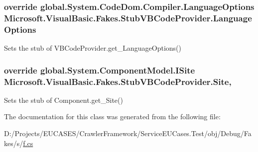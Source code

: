 \hypertarget{class_microsoft_1_1_visual_basic_1_1_fakes_1_1_stub_v_b_code_provider_ae7d748db0ca25f0105266509a590fe8c}{
\subsubsection[{Language\-Options}]{\setlength{\rightskip}{0pt plus 5cm}override global.\-System.\-Code\-Dom.\-Compiler.\-Language\-Options Microsoft.\-Visual\-Basic.\-Fakes.\-Stub\-V\-B\-Code\-Provider.\-Language\-Options\hspace{0.3cm}{\ttfamily [get]}}}\label{class_microsoft_1_1_visual_basic_1_1_fakes_1_1_stub_v_b_code_provider_ae7d748db0ca25f0105266509a590fe8c}


Sets the stub of V\-B\-Code\-Provider.\-get\-\_\-\-Language\-Options()

\hypertarget{class_microsoft_1_1_visual_basic_1_1_fakes_1_1_stub_v_b_code_provider_a75e5c8469c906665058f0ffc4a241e16}{
\subsubsection[{Site}]{\setlength{\rightskip}{0pt plus 5cm}override global.\-System.\-Component\-Model.\-I\-Site Microsoft.\-Visual\-Basic.\-Fakes.\-Stub\-V\-B\-Code\-Provider.\-Site\hspace{0.3cm}{\ttfamily [get]}, {\ttfamily [set]}}}\label{class_microsoft_1_1_visual_basic_1_1_fakes_1_1_stub_v_b_code_provider_a75e5c8469c906665058f0ffc4a241e16}


Sets the stub of Component.\-get\-\_\-\-Site()



The documentation for this class was generated from the following file\-:\begin{DoxyCompactItemize}
\item 
D\-:/\-Projects/\-E\-U\-C\-A\-S\-E\-S/\-Crawler\-Framework/\-Service\-E\-U\-Cases.\-Test/obj/\-Debug/\-Fakes/s/\hyperlink{s_2f_8cs}{f.\-cs}\end{DoxyCompactItemize}
